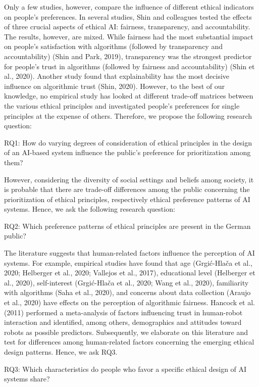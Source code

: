 \documentclass{article}
\begin{document}
Only a few studies, however, compare the influence of different ethical
indicators on people's preferences. In several studies, Shin and
colleagues tested the effects of three crucial aspects of ethical AI:
fairness, transparency, and accountability. The results, however, are
mixed. While fairness had the most substantial impact on people's
satisfaction with algorithms (followed by transparency and
accountability) (Shin and Park, 2019), transparency was the strongest
predictor for people's trust in algorithms (followed by fairness and
accountability) (Shin et al., 2020). Another study found that
explainability has the most decisive influence on algorithmic trust
(Shin, 2020). However, to the best of our knowledge, no empirical study
has looked at different trade-off matrices between the various ethical
principles and investigated people's preferences for single principles
at the expense of others. Therefore, we propose the following research
question:

RQ1: How do varying degrees of consideration of ethical principles in
the design of an AI-based system influence the public's preference for
prioritization among them?

However, considering the diversity of social settings and beliefs among
society, it is probable that there are trade-off differences among the
public concerning the prioritization of ethical principles, respectively
ethical preference patterns of AI systems. Hence, we ask the following
research question:

RQ2: Which preference patterns of ethical principles are present in the
German public?

The literature suggests that human-related factors influence the
perception of AI systems. For example, empirical studies have found that
age (Grgić-Hlača et al., 2020; Helberger et al., 2020; Vallejos et al.,
2017), educational level (Helberger et al., 2020), self-interest
(Grgić-Hlača et al., 2020; Wang et al., 2020), familiarity with
algorithms (Saha et al., 2020), and concerns about data collection
(Araujo et al., 2020) have effects on the perception of algorithmic
fairness. Hancock et al. (2011) performed a meta-analysis of factors
influencing trust in human-robot interaction and identified, among
others, demographics and attitudes toward robots as possible predictors.
Subsequently, we elaborate on this literature and test for differences
among human-related factors concerning the emerging ethical design
patterns. Hence, we ask RQ3.

RQ3: Which characteristics do people who favor a specific ethical design
of AI systems share?
\end{document}
